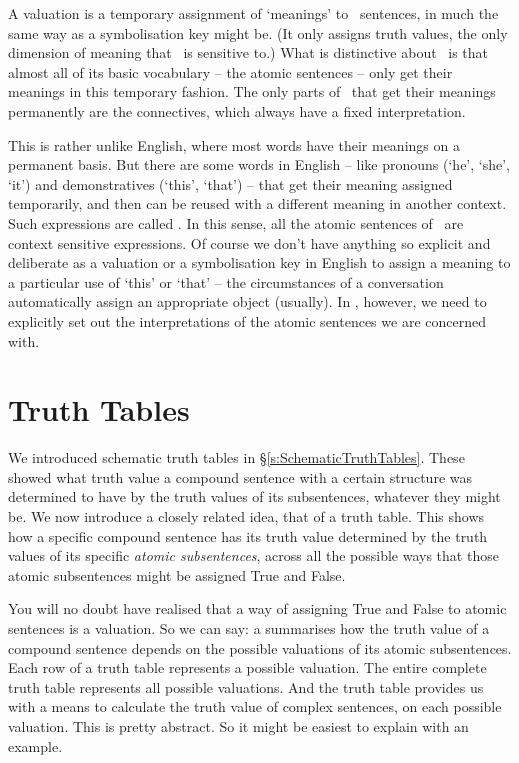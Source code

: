 A valuation is a temporary assignment of `meanings' to \TFL\ sentences, in much the same way as a symbolisation key might be. (It only assigns truth values, the only dimension of meaning that \TFL\ is sensitive to.) What is distinctive about \TFL\ is that almost all of its basic vocabulary – the atomic sentences – only get their meanings in this temporary fashion. The only parts of \TFL\ that get their meanings permanently are the connectives, which always have a fixed interpretation. 

This is rather unlike English, where most words have their meanings on a permanent basis. But there are some words in English – like pronouns (`he', `she', `it') and demonstratives (`this', `that') – that get their meaning assigned temporarily, and then can be reused with a different meaning in another context. Such expressions are called . In this sense, all the atomic sentences of \TFL\ are context sensitive expressions. Of course we don't have anything so explicit and deliberate as a valuation or a symbolisation key in English to assign a meaning to a particular use of `this' or `that' – the circumstances of a conversation automatically assign an appropriate object (usually). In \TFL, however, we need to explicitly set out the interpretations of the atomic sentences we are concerned with. 

\section{Truth Tables}

We introduced schematic truth tables in §\ref{s:SchematicTruthTables}. These showed what truth value a compound sentence with a certain structure was determined to have by the truth values of its subsentences, whatever they might be. We now introduce a closely related idea, that of a truth table. This shows how a specific compound sentence has its truth value determined by the truth values of its specific \emph{atomic subsentences}, across all the possible ways that those atomic subsentences might be assigned True and False.

You will no doubt have realised that a way of assigning True and False to atomic sentences is a valuation. So we can say: a  summarises how the truth value of a compound sentence depends on the possible valuations of its atomic subsentences. Each row of a truth table represents a possible valuation. The entire complete truth table represents all possible valuations. And the truth table provides us with a means to calculate the truth value of complex sentences, on each possible valuation. This is pretty abstract. So it might be easiest to explain with an example.

